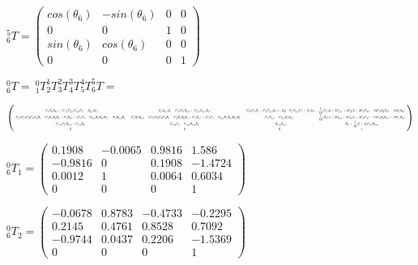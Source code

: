 \documentclass[8pt]{article}
\begin{document}
\begin{list}{()~}{}
$^5_6T = \left( \begin{array}{cccc}
cos(\theta_6) & -sin(\theta_6) & 0 & 0 \\
0 & 0 & 1 & 0 \\
sin(\theta_6) & cos(\theta_6) & 0 & 0 \\
0 & 0 & 0 & 1
\end{array} \right) $

$^0_6T = \ ^0_1T ^1_2T ^2_3T ^3_4T ^4_5T ^5_6T =$

\newcommand\scalemath[2]{\scalebox{#1}{\mbox{\ensuremath{\displaystyle #2}}}}

$ \left( 
\scalemath{0.38}{
\begin{array}{cccc}
- C_6 S_1 S_{4,5} + C_1 (C_{2,3} C_{4,5} C_6 - S_{2,3} S_6) & S_1 S_{4,5} S_6 - 
 C_1 (C_6 S_{2,3} + C_{2,3} C_{4,5} S_6) & -C_4 (C_5 S_1 + C_1 C_{2,3} S_5) + 
 S_4 (-C_1 C_{2,3} C_5 + S_1 S_5) & \dfrac{1}{10} (C_1 (3 + 2 C_{2,3} + 5 C_2 (2 + 3 C_3 C_4) - 
      15 C_4 S_2 S_3) - 15 S_1 S_4) \\
C_6 (C_5 (C_2 C_3 C_4 S_1 - 
       C_4 S_1 S_2 S_3 + 
       C_1 S_4) + (C_1 C_4 - 
       C_{2,3} S_1 S_4) S_5) - 
 S_1 S_{2,3} S_6 & -C_6 S_1 S_{2,3} - (C_5 (C_2 C_3 C_4 S_1 - 
       C_4 S_1 S_2 S_3 + 
       C_1 S_4) + (C_1 C_4 - 
       C_{2,3} S_1 S_4) S_5) S_6 & C_1 C_{4,5} - C_{2,3} S_1 S_{4,5} & \dfrac{1}{10} (S_1 (3 + 2 C_{2,3} + 5 C_2 (2 + 3 C_3 C_4) - 
      15 C_4 S_2 S_3) + 15 C_1 S_4) \\
 C_{4,5} C_{6} S_{2,3} + C_{2,3} S_6 & C_{2,3} C_6 - C_{4,5} S_{2,3} S_6 & -S_{2,3} S_{4,5} & S_2 + \dfrac{1}{10} (2 + 15 C_4) S_{2,3} \\
 0 & 0 & 0 & 1
\end{array}
}
 \right) $

\item

$^0_6T_1 = \left( \begin{array}{cccc}
0.1908 & -0.0065 & 0.9816 & 1.586 \\
-0.9816  & 0 & 0.1908 & -1.4724 \\
0.0012  & 1 & 0.0064 & 0.6034 \\
0 & 0 & 0 & 1
\end{array} \right) $

$^0_6T_2 = \left( \begin{array}{cccc}
-0.0678 & 0.8783 &  -0.4733 & -0.2295 \\
 0.2145 & 0.4761 & 0.8528 & 0.7092 \\
-0.9744  & 0.0437 & 0.2206 & -1.5369 \\
0 & 0 & 0 & 1
\end{array} \right) $


\end{list}
\end{document}
